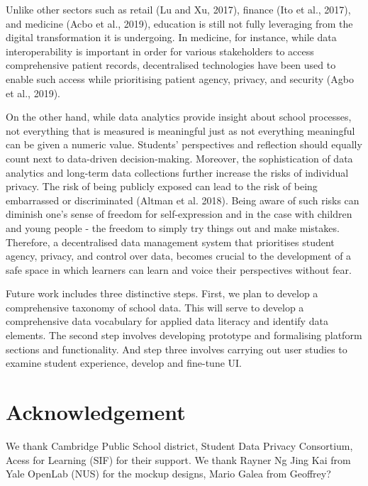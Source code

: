 \documentclass{article}
\begin{document}
Unlike other sectors such as retail (Lu and Xu, 2017), finance (Ito et al., 2017), and medicine (Acbo et al., 2019), education is still not fully leveraging from the digital transformation it is undergoing. In medicine, for instance, while data interoperability is important in order for various stakeholders to access comprehensive patient records, decentralised technologies have been used to enable such access while prioritising patient agency, privacy, and security (Agbo et al., 2019). 

On the other hand, while data analytics provide insight about school processes, not everything that is measured is meaningful just as not everything meaningful can be given a numeric value. Students’ perspectives and reflection should equally count next to data-driven decision-making. Moreover, the sophistication of data analytics and long-term data collections further increase the risks of individual privacy. The risk of being publicly exposed can lead to the risk of being embarrassed or discriminated (Altman et al. 2018). Being aware of such risks can diminish one’s sense of freedom for self-expression and in the case with children and young people - the freedom to simply try things out and make mistakes. Therefore, a decentralised data management system that prioritises student agency, privacy, and control over data, becomes crucial to the development of a safe space in which learners can learn and voice their perspectives without fear. 

Future work includes three distinctive steps. First, we plan to develop a comprehensive taxonomy of school data. This will serve to develop a comprehensive data vocabulary for applied data literacy and identify data elements. The second step involves developing prototype and formalising platform sections and functionality. And step three involves carrying out user studies to examine student experience, develop and fine-tune UI. 


\section{Acknowledgement}
We thank Cambridge Public School district, Student Data Privacy Consortium, Acess for Learning (SIF) for their support. We thank Rayner Ng Jing Kai from Yale OpenLab (NUS) for the mockup designs, Mario Galea from  Geoffrey?
\end{document}
